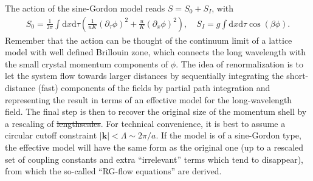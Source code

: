 \documentclass{svmono}
\def\rd{\mathrm d}
\newcommand{\brlr}[1]{\left( #1 \right)}
\providecommand{\DIFaddtex}[1]{{\protect\color{blue}\uwave{#1}}} %
\providecommand{\DIFdeltex}[1]{{\protect\color{red}\sout{#1}}}                      %
\providecommand{\DIFaddbegin}{} %
\providecommand{\DIFaddend}{} %
\providecommand{\DIFdelbegin}{} %
\providecommand{\DIFdelend}{} %
\providecommand{\DIFadd}[1]{\texorpdfstring{\DIFaddtex{#1}}{#1}} %
\providecommand{\DIFdel}[1]{\texorpdfstring{\DIFdeltex{#1}}{}} %
\newcommand{\DIFscaledelfig}{0.5}
\newlength{\DIFdelgraphicswidth} %
\newlength{\DIFdelgraphicsheight} %
\newcommand{\DIFaddincludegraphics}[2][]{{\color{blue}\fbox{\DIFOincludegraphics[#1]{#2}}}} %
\newcommand{\DIFdelincludegraphics}[2][]{%
\sbox{\DIFdelgraphicsbox}{\DIFOincludegraphics[#1]{#2}}%
\settoboxwidth{\DIFdelgraphicswidth}{\DIFdelgraphicsbox} %
\settoboxtotalheight{\DIFdelgraphicsheight}{\DIFdelgraphicsbox} %
\scalebox{\DIFscaledelfig}{%
\parbox[b]{\DIFdelgraphicswidth}{\usebox{\DIFdelgraphicsbox}\\[-\baselineskip] \rule{\DIFdelgraphicswidth}{0em}}\llap{\resizebox{\DIFdelgraphicswidth}{\DIFdelgraphicsheight}{%
\setlength{\unitlength}{\DIFdelgraphicswidth}%
\begin{picture}(1,1)%
\thicklines\linethickness{2pt} %
{\color[rgb]{1,0,0}\put(0,0){\framebox(1,1){}}}%
{\color[rgb]{1,0,0}\put(0,0){\line( 1,1){1}}}%
{\color[rgb]{1,0,0}\put(0,1){\line(1,-1){1}}}%
\end{picture}%
}\hspace*{3pt}}} %
} %
\DeclareRobustCommand{\DIFaddbegin}{\DIFOaddbegin \let\includegraphics\DIFaddincludegraphics} %
\DeclareRobustCommand{\DIFaddend}{\DIFOaddend \let\includegraphics\DIFOincludegraphics} %
\DeclareRobustCommand{\DIFdelbegin}{\DIFOdelbegin \let\includegraphics\DIFdelincludegraphics} %
\DeclareRobustCommand{\DIFdelend}{\DIFOaddend \let\includegraphics\DIFOincludegraphics} %
\begin{document}
\DIFaddend The action of the sine-Gordon model reads $S = S_0 + S_I$, with
\begin{align}
    S_0 = \frac1{2\pi}\int\rd x\rd\tau\brlr{\frac1{uK}(\partial_\tau\phi)^2 + \frac uK (\partial_x\phi)^2}
    ,\quad
    S_I = g\int\rd x\rd\tau\cos(\beta\phi)
    .
\end{align}
Remember that the action can be thought of the continuum limit of a lattice model with well defined Brillouin zone, which connects the long wavelength with the small crystal momentum components of $\phi$.
The idea of renormalization is to let the system flow towards larger distances by sequentially integrating the short-distance (fast) components of the fields by partial path integration and representing the result in terms of an effective model for the long-wavelength field.
The final step is then to recover the original size of the momentum shell by a rescaling of \DIFdelbegin \DIFdel{lengthscales}\DIFdelend \DIFaddbegin \DIFadd{length scales}\DIFaddend .
For technical convenience, it is best to assume a circular cutoff constraint $|{\bm k}|<\Lambda\sim2\pi/a$.
If the model is of a sine-Gordon type, the effective model will have the same form as the original one (up to a rescaled set of coupling constants and extra ``irrelevant'' terms which tend to disappear), from which the so-called ``RG-flow equations'' are derived.
\end{document}
